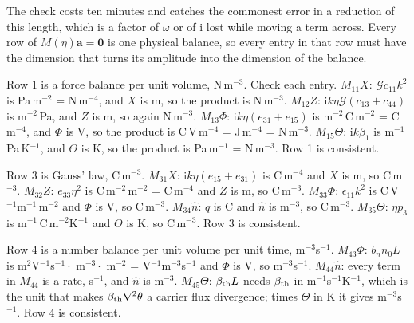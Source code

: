 \documentclass[11pt]{article}
\makeatletter
\newif\ifshowworked
\newenvironment{worked}{%
  \ifshowworked\par\smallskip\noindent\textit{Working.}\par\smallskip\else
  \setbox\z@\vbox\bgroup\fi}{\ifshowworked\par\smallskip\else\egroup\fi}
\newcommand{\ii}{\mathrm{i}}
\newcommand{\Gcal}{\mathcal{G}}
\makeatother
\begin{document}
The check costs ten minutes and catches the commonest error in a reduction of this length, which is a
factor of $\omega$ or of $\ii$ lost while moving a term across. Every row of $M(\eta)\mathbf a=\mathbf 0$
is one physical balance, so every entry in that row must have the dimension that turns its amplitude into
the dimension of the balance.

\begin{worked}
Row 1 is a force balance per unit volume, N\,m$^{-3}$. Check each entry.
$M_{11}X$: $\Gcal c_{11}k^2$ is Pa\,m$^{-2}$ = N\,m$^{-4}$, and $X$ is m, so the product is N\,m$^{-3}$.
$M_{12}Z$: $\ii k\eta\Gcal(c_{13}+c_{44})$ is m$^{-2}\,$Pa, and $Z$ is m, so again N\,m$^{-3}$.
$M_{13}\Phi$: $\ii k\eta(e_{31}+e_{15})$ is m$^{-2}$\,C\,m$^{-2}$ = C\,m$^{-4}$, and $\Phi$ is V, so the
product is C\,V\,m$^{-4}$ = J\,m$^{-4}$ = N\,m$^{-3}$.
$M_{15}\Theta$: $\ii k\beta_1$ is m$^{-1}$\,Pa\,K$^{-1}$, and $\Theta$ is K, so the product is
Pa\,m$^{-1}$ = N\,m$^{-3}$. Row 1 is consistent.
\end{worked}

\begin{worked}
Row 3 is Gauss' law, C\,m$^{-3}$. $M_{31}X$: $\ii k\eta(e_{15}+e_{31})$ is C\,m$^{-4}$ and $X$ is m, so
C\,m$^{-3}$. $M_{32}Z$: $e_{33}\eta^2$ is C\,m$^{-2}$\,m$^{-2}$ = C\,m$^{-4}$ and $Z$ is m, so C\,m$^{-3}$.
$M_{33}\Phi$: $\epsilon_{11}k^2$ is C\,V$^{-1}$m$^{-1}$\,m$^{-2}$ and $\Phi$ is V, so C\,m$^{-3}$.
$M_{34}\hat n$: $q$ is C and $\hat n$ is m$^{-3}$, so C\,m$^{-3}$.
$M_{35}\Theta$: $\eta p_3$ is m$^{-1}$\,C\,m$^{-2}$K$^{-1}$ and $\Theta$ is K, so C\,m$^{-3}$. Row 3 is
consistent.
\end{worked}

\begin{worked}
Row 4 is a number balance per unit volume per unit time, m$^{-3}$s$^{-1}$.
$M_{43}\Phi$: $b_nn_0L$ is m$^2$V$^{-1}$s$^{-1}\cdot$ m$^{-3}\cdot$ m$^{-2}$ = V$^{-1}$m$^{-3}$s$^{-1}$ and
$\Phi$ is V, so m$^{-3}$s$^{-1}$.
$M_{44}\hat n$: every term in $M_{44}$ is a rate, s$^{-1}$, and $\hat n$ is m$^{-3}$.
$M_{45}\Theta$: $\beta_{\rm th}L$ needs $\beta_{\rm th}$ in m$^{-1}$s$^{-1}$K$^{-1}$, which is the unit that
makes $\beta_{\rm th}\nabla^2\theta$ a carrier flux divergence; times $\Theta$ in K it gives
m$^{-3}$s$^{-1}$. Row 4 is consistent.
\end{worked}
\end{document}

